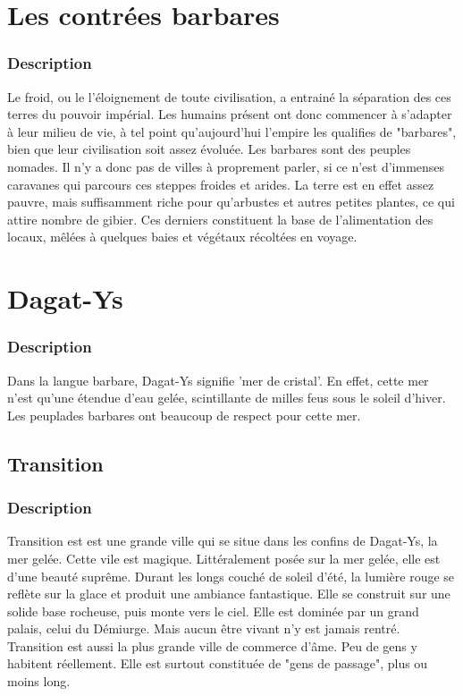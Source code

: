 \section{Les contrées barbares}
\subsubsection{Description}
\hypertarget {lescontreesbarbares}{}
Le froid, ou le l'éloignement de toute civilisation, a entrainé la séparation des ces terres du pouvoir impérial. Les humains présent ont donc commencer à s'adapter à leur milieu de vie, à tel point qu'aujourd'hui l'empire les qualifies de "barbares", bien que leur civilisation soit assez évoluée.
Les barbares sont des peuples nomades. Il n'y a donc pas de villes à proprement parler, si ce n'est d'immenses caravanes qui parcours ces steppes froides et arides.
La terre est en effet assez pauvre, mais suffisamment riche pour qu'arbustes et autres  petites plantes, ce qui attire nombre de gibier. Ces derniers constituent la base de l'alimentation des locaux, mêlées à quelques baies et végétaux récoltées en voyage.
\section{Dagat-Ys}
\subsubsection{Description}
\hypertarget {dagatys}{}Dans la langue barbare, Dagat-Ys signifie 'mer de cristal'.
En effet, cette mer n'est qu'une étendue d'eau gelée, scintillante de milles feus sous le soleil d'hiver.
Les peuplades barbares ont beaucoup de respect pour cette mer.
\subsection{Transition}
\subsubsection{Description}
\hypertarget {transition}{}
Transition est est une grande ville qui se situe dans les confins de Dagat-Ys, la mer gelée. 
Cette vile est magique. Littéralement posée sur la mer gelée, elle est d'une beauté suprême.
Durant les longs couché de soleil d'été, la lumière rouge se reflète sur la glace et produit une ambiance fantastique. Elle se construit sur une solide base rocheuse, puis monte vers le ciel.
Elle est dominée par un grand palais, celui du Démiurge. Mais aucun être vivant n'y est jamais rentré.
Transition est aussi la plus grande ville de commerce d'âme. Peu de gens y habitent réellement.
Elle est surtout constituée de "gens de passage", plus ou moins long.
